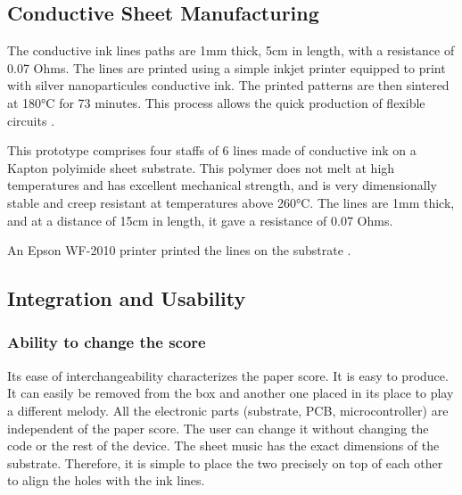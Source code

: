 
\subsection{Conductive Sheet Manufacturing}

The conductive ink lines paths are 1mm thick, 5cm in length, with a resistance of 0.07 Ohms. The lines are printed using a simple inkjet printer equipped to print with silver nanoparticules conductive ink. The printed patterns are then sintered at 180°C for 73 minutes. This process allows the quick production of flexible circuits \cite{khan2019soft}.

This prototype comprises four staffs of 6 lines made of conductive ink on a Kapton polyimide sheet substrate. This polymer does not melt at high temperatures and has excellent mechanical strength, and is very dimensionally stable and creep resistant at temperatures above 260°C. The lines are 1mm thick, and at a distance of 15cm in length, it gave a resistance of 0.07 Ohms.


An Epson WF-2010 printer printed the lines on the substrate \cite{adrien2022capacitive_to_notes}.


\subsection{Integration and Usability}

\subsubsection{Ability to change the score}

Its ease of interchangeability characterizes the paper score. It is easy to produce. It
can easily be removed from the box and another one placed in its place to play a
different melody. All the electronic parts (substrate, PCB, microcontroller) are
independent of the paper score. The user can change it without changing the code or
the rest of the device. The sheet music has the exact dimensions of the substrate.
Therefore, it is simple to place the two precisely on top of each other to align the
holes with the ink lines.

